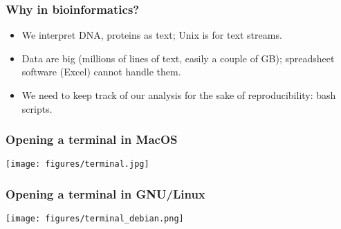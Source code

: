 \documentclass{beamer}
\begin{document}
\begin{frame}
  \frametitle{Why in bioinformatics?}
  \begin{itemize}
  \item We interpret DNA, proteins as text; Unix is for text streams.
  \item Data are big (millions of lines of text, easily a couple of GB); spreadsheet software (Excel) cannot handle them.
  \item We need to keep track of our analysis for the sake of reproducibility: bash scripts.
  \end{itemize}
\end{frame}

\begin{frame}
  \frametitle{Opening a terminal in MacOS}
\centering
\texttt{[image: figures/terminal.jpg]}
\end{frame}

\begin{frame}
  \frametitle{Opening a terminal in GNU/Linux}
\centering
\texttt{[image: figures/terminal\_debian.png]}
\end{frame}









\end{document}
